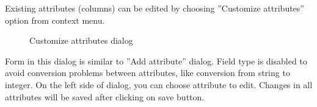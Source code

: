 Existing attributes (columns) can be edited by choosing ''Customize attributes'' option from context menu.

\begin{figure*}[!ht] 
	\centering
	\caption{Customize attributes dialog}
\end{figure*}

Form in this dialog is similar to ''Add attribute'' dialog. Field type is disabled to avoid conversion problems between attributes, like conversion from string to integer. On the left side of dialog, you can choose attribute to edit. Changes in all attributes will be saved after clicking on save button.


\vfill\newpage